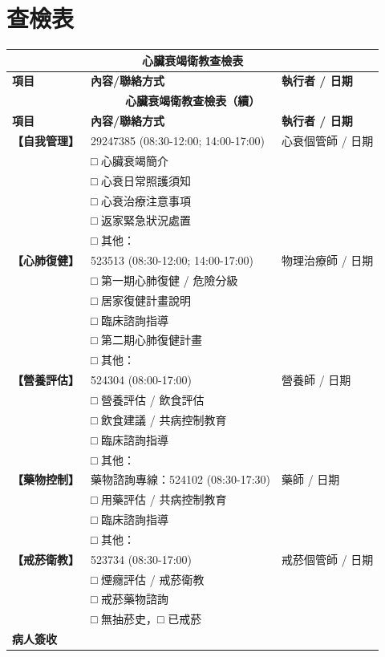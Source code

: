 \documentclass[nols]{tufte-book}
\begin{document}
\chapter*{查檢表}
\begingroup
\small
\begin{longtable}{|l|p{6cm}|p{4cm}|}
\hline
\multicolumn{3}{|c|}{\textbf{心臟衰竭衛教查檢表}} \\
\hline
\textbf{項目} & \textbf{內容/聯絡方式} & \textbf{執行者 / 日期} \\
\hline
\endfirsthead

\hline
\multicolumn{3}{|c|}{\textbf{心臟衰竭衛教查檢表（續）}} \\
\hline
\textbf{項目} & \textbf{內容/聯絡方式} & \textbf{執行者 / 日期} \\
\hline
\endhead

\hline
\endfoot

\textbf{【自我管理】} & 29247385  (08:30-12:00; 14:00-17:00)  & 心衰個管師 / 日期 \\
\hline
 & □ 心臟衰竭簡介 & \\
 & □ 心衰日常照護須知 & \\
 & □ 心衰治療注意事項 & \\
 & □ 返家緊急狀況處置 & \\
 & □ 其他： & \\
\hline
\textbf{【心肺復健】} & 523513 (08:30-12:00; 14:00-17:00) & 物理治療師 / 日期 \\
\hline
 & □ 第一期心肺復健 / 危險分級 & \\
 & □ 居家復健計畫說明 & \\
 & □ 臨床諮詢指導 & \\
 & □ 第二期心肺復健計畫 & \\
 & □ 其他： & \\
\hline
\textbf{【營養評估】} & 524304 (08:00-17:00) & 營養師 / 日期 \\
\hline
 & □ 營養評估 / 飲食評估 & \\
 & □ 飲食建議 / 共病控制教育 & \\
 & □ 臨床諮詢指導 & \\
 & □ 其他： & \\
\hline
\textbf{【藥物控制】} & 藥物諮詢專線：524102 (08:30-17:30) & 藥師 / 日期 \\
\hline
 & □ 用藥評估 / 共病控制教育 & \\
 & □ 臨床諮詢指導 & \\
 & □ 其他： & \\
\hline
\textbf{【戒菸衛教】} & 523734 (08:30-17:00) & 戒菸個管師 / 日期 \\
\hline
 & □ 煙癮評估 / 戒菸衛教 & \\
 & □ 戒菸藥物諮詢 & \\
 & □ 無抽菸史，□ 已戒菸 & \\
\hline
\textbf{病人簽收} & & \\
\hline
\end{longtable}
\endgroup
\end{document}
